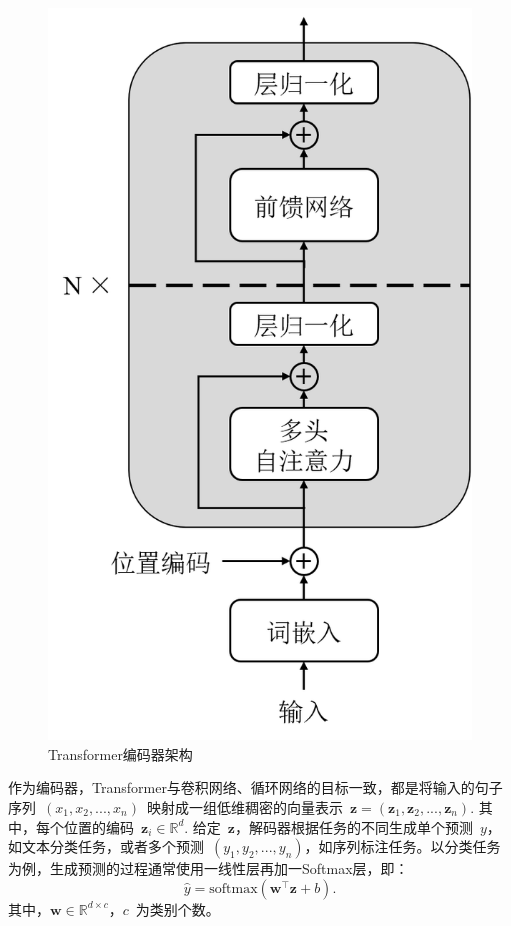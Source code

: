 \begin{figure}[htb]
	\centering
	\includegraphics[scale=0.55]{tf.png}
	\caption{Transformer编码器架构}
	\label{fig:tf_encoder}
\end{figure}

作为编码器，Transformer与卷积网络、循环网络的目标一致，都是将输入的句子序列~$(x_1, x_2, ..., x_n)$~映射成一组低维稠密的向量表示~$\mathbf{z} = (\mathbf{z}_1, \mathbf{z}_2, ..., \mathbf{z}_n)$. 其中，每个位置的编码~$\mathbf{z}_i \in \mathbb{R}^{d}$. 给定~$\mathbf{z}$，解码器根据任务的不同生成单个预测~$y$，如文本分类任务，或者多个预测~$(y_1, y_2, ..., y_n)$，如序列标注任务。以分类任务为例，生成预测的过程通常使用一线性层再加一Softmax层，即：
\begin{equation}
	\hat{y} = \mathrm{softmax}(\mathbf{w}^\top \mathbf{z} + b).
\end{equation}
其中，$\mathbf{w}\in \mathbb{R}^{d\times c}$，$c$~为类别个数。

